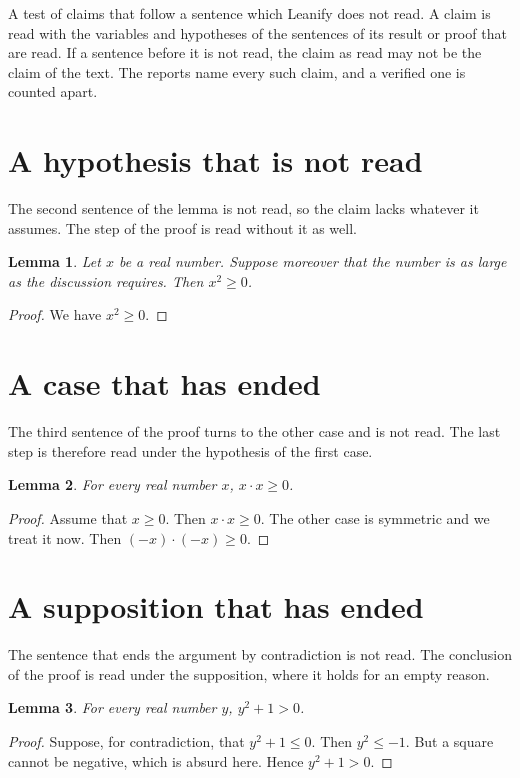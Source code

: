 \documentclass{article}
\newtheorem{lemma}{Lemma}
\begin{document}
A test of claims that follow a sentence which Leanify does not read. A claim is read
with the variables and hypotheses of the sentences of its result or proof that are read.
If a sentence before it is not read, the claim as read may not be the claim of the text.
The reports name every such claim, and a verified one is counted apart.

\section{A hypothesis that is not read}

The second sentence of the lemma is not read, so the claim lacks whatever it assumes. The
step of the proof is read without it as well.

\begin{lemma}\label{missing}
Let $x$ be a real number. Suppose moreover that the number is as large as the discussion requires. Then $x^2\ge0$.
\end{lemma}
\begin{proof}
We have $x^2\ge0$.
\end{proof}

\section{A case that has ended}

The third sentence of the proof turns to the other case and is not read. The last step is
therefore read under the hypothesis of the first case.

\begin{lemma}\label{cases}
For every real number $x$, $x\cdot x\ge0$.
\end{lemma}
\begin{proof}
Assume that $x\ge0$. Then $x\cdot x\ge0$. The other case is symmetric and we treat it now. Then $(-x)\cdot(-x)\ge0$.
\end{proof}

\section{A supposition that has ended}

The sentence that ends the argument by contradiction is not read. The conclusion of the
proof is read under the supposition, where it holds for an empty reason.

\begin{lemma}\label{contra}
For every real number $y$, $y^2+1>0$.
\end{lemma}
\begin{proof}
Suppose, for contradiction, that $y^2+1\le0$. Then $y^2\le-1$. But a square cannot be negative, which is absurd here. Hence $y^2+1>0$.
\end{proof}
\end{document}
